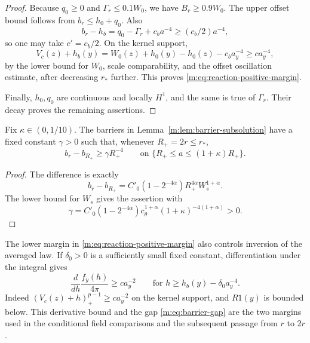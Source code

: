 \begin{proof}
Because $q_0\ge0$ and $\Gamma_r\le0.1W_0$, we have $B_r\ge0.9W_0$.
The upper offset bound follows from $b_r\le h_0+q_0$.  Also
\[
 b_r-h_b=q_0-\Gamma_r+c_ba^{-4}\ge(c_b/2)a^{-4},
\]
so one may take $c'=c_b/2$.  On the kernel support,
\[
 V_c(z)+h_b(y)
   =W_0(z)+h_0(y)-h_0(z)-c_ba_y^{-4}
   \ge ca_y^{-4},
\]
by the lower bound for $W_0$, scale comparability, and the offset
oscillation estimate, after decreasing $r_*$ further.  This proves
\eqref{m:eq:reaction-positive-margin}.

Finally, $h_0,q_0$ are continuous and locally $H^1$, and the same is true
of $\Gamma_r$.  Their decay proves the remaining assertions.
\end{proof}

\begin{lemma}\label{m:lem:barrier-gap}
Fix $\kappa\in(0,1/10)$.  The barriers in
Lemma~\ref{m:lem:barrier-subsolution} have a fixed constant $\gamma>0$ such
that, whenever $R_+=2r\le r_*$,
\begin{equation}\label{m:eq:barrier-gap}
 b_r-b_{R_+}\ge\gamma R_+^{-4}
 \qquad\text{on }\{R_+\le a\le(1+\kappa)R_+\}.
\end{equation}
\end{lemma}

\begin{proof}
The difference is exactly
\[
 b_r-b_{R_+}
   =C'_0(1-2^{-4\alpha})R_+^{4\alpha}W_s^{1+\alpha}.
\]
The lower bound for $W_s$ gives the assertion with
\[
 \gamma=C'_0(1-2^{-4\alpha})
       c_\theta^{1+\alpha}(1+\kappa)^{-4(1+\alpha)}>0.
\]
\end{proof}

The lower margin in \eqref{m:eq:reaction-positive-margin} also controls
inversion of the averaged law.  If $\delta_0>0$ is a sufficiently small
fixed constant, differentiation under the integral gives
\begin{equation}\label{m:eq:barrier-reaction-derivative}
 \frac{d}{dh}\frac{f_y(h)}{4\pi}\ge ca_y^{-2}
 \qquad\text{for }h\ge h_b(y)-\delta_0a_y^{-4}.
\end{equation}
Indeed $(V_c(z)+h)_+^{p-1}\ge ca_y^{-2}$ on the kernel support, and
$R1(y)$ is bounded below.  This derivative bound and the gap
\eqref{m:eq:barrier-gap} are the two margins used in the conditional field
comparisons and the subsequent passage from $r$ to $2r$.
